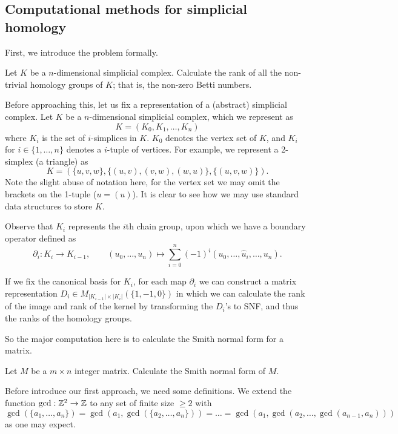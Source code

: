 \subsection*{Computational methods for simplicial homology}

First, we introduce the problem formally.

\begin{problem}
	Let $K$ be a $n$-dimensional simplicial complex. Calculate the rank of all the non-trivial homology groups of $K$; that is, the non-zero Betti numbers. 
\end{problem}

Before approaching this, let us fix a representation of a (abstract) simplicial complex. Let $K$ be a $n$-dimensional simplicial complex, which we represent as
\[
 K = (K_0, K_1, \ldots, K_n)
\]
where $K_i$ is the set of $i$-simplices in $K$. $K_0$ denotes the vertex set of $K$, and $K_i$ for $i \in \{1, \ldots, n\}$ denotes a $i$-tuple of vertices. For example, we represent a 2-simplex (a triangle) as
\[ K = (\{u,v,w\}, \{(u,v), (v,w), (w,u)\}, \{(u,v,w)\}). \]
Note the slight abuse of notation here, for the vertex set we may omit the brackets on the 1-tuple ($u = (u)$). It is clear to see how we may use standard data structures to store $K$. 

Observe that $K_i$ represents the $i$th chain group, upon which we have a boundary operator defined as
\[
	\partial_i: K_i \to K_{i-1}, \qquad
	(u_0, \ldots, u_n) \mapsto \sum_{i=0}^n (-1)^i (u_0, \ldots, \hat u_i, \ldots, u_n).
\]

If we fix the canonical basis for $K_i$, for each map $\partial_i$ we can construct a matrix representation $D_i \in M_{\lvert K_{i-1} \rvert \times \lvert K_i \rvert}(\{1,-1,0\})$ in which we can calculate the rank of the image and rank of the kernel by transforming the $D_i$'s to SNF, and thus the ranks of the homology groups. 

So the major computation here is to calculate the Smith normal form for a matrix.

\begin{problem}
	Let $M$ be a $m \times n$ integer matrix. Calculate the Smith normal form of $M$.
\end{problem}

Before introduce our first approach, we need some definitions. We extend the function $\gcd: \mathbb{Z}^2 \to \mathbb{Z}$ to any set of finite size $\geq 2$ with $\gcd(\{a_1, \ldots, a_n\}) = \gcd(a_1, \gcd(\{a_2, \ldots, a_n\})) = \ldots = \gcd(a_1, \gcd(a_2, \ldots, \gcd(a_{n-1}, a_n)))$ as one may expect.

